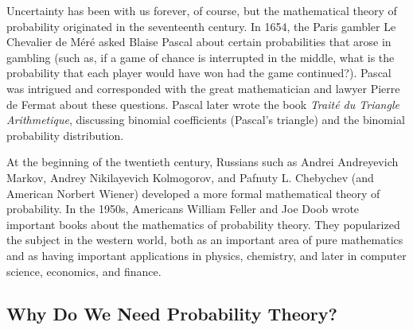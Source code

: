 Uncertainty has been with us forever, of course, but the mathematical theory of probability originated in the
seventeenth century. In 1654, the Paris gambler Le Chevalier de M\'er\'e asked Blaise Pascal about certain
probabilities that arose in gambling (such as, if a game of chance is interrupted in the middle, what is the
probability that each player would have won had the game continued?). Pascal was intrigued and corresponded with the
great mathematician and lawyer Pierre de Fermat about these questions. Pascal later wrote the book \emph{Trait\'e du
Triangle Arithmetique}, discussing binomial coefficients (Pascal's triangle) and the binomial probability
distribution.

At the beginning of the twentieth century, Russians such as Andrei Andreyevich Markov, Andrey Nikilayevich
Kolmogorov, and Pafnuty L. Chebychev (and American Norbert Wiener) developed a more formal mathematical theory of
probability. In the 1950s, Americans William Feller and Joe Doob wrote important books about the mathematics of
probability theory. They popularized the subject in the western world, both as an important area of pure mathematics
and as having important applications in physics, chemistry, and later in computer science, economics, and finance.

\subsection{Why Do We Need Probability Theory?}
\lipsum[1-10]
